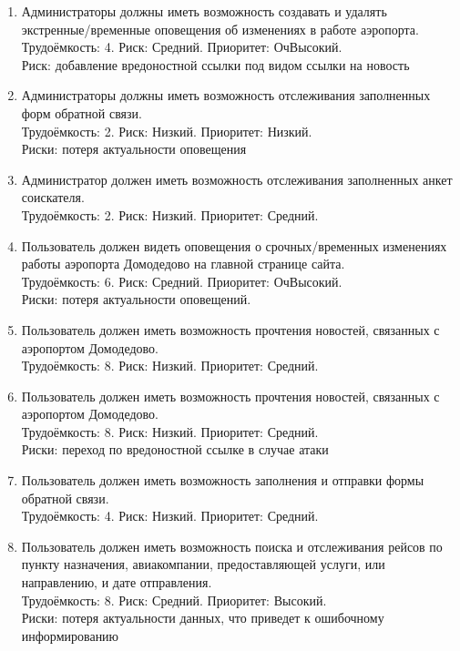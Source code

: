 \begin{enumerate}
    \item Администраторы должны иметь возможность создавать и удалять
          экстренные/временные оповещения об изменениях в работе аэропорта. \\
          Трудоёмкость: 4. Риск: Средний. Приоритет: ОчВысокий. \\
          Риск: добавление вредоностной ссылки под видом ссылки на новость

    \item Администраторы должны иметь возможность отслеживания
          заполненных форм обратной связи. \\
          Трудоёмкость: 2. Риск: Низкий. Приоритет: Низкий. \\
          Риски: потеря актуальности оповещения

    \item Администратор должен иметь возможность отслеживания
          заполненных анкет соискателя. \\
          Трудоёмкость: 2. Риск: Низкий. Приоритет: Средний.

    \item Пользователь должен видеть оповещения о срочных/временных
          изменениях работы аэропорта Домодедово на главной странице сайта. \\
          Трудоёмкость: 6. Риск: Средний. Приоритет: ОчВысокий. \\
          Риски: потеря актуальности оповещений.
          
    \item Пользователь должен иметь возможность прочтения новостей,
          связанных с аэропортом Домодедово. \\
          Трудоёмкость: 8. Риск: Низкий. Приоритет: Средний.

    \item Пользователь должен иметь возможность прочтения новостей,
          связанных с аэропортом Домодедово. \\
          Трудоёмкость: 8. Риск: Низкий. Приоритет: Средний. \\
          Риски: переход по вредоностной ссылке в случае атаки

    \item Пользователь должен иметь возможность заполнения и 
          отправки формы обратной связи. \\
          Трудоёмкость: 4. Риск: Низкий. Приоритет: Средний.

    \item Пользователь должен иметь возможность поиска и отслеживания 
          рейсов по пункту назначения, авиакомпании, предоставляющей услуги, 
          или направлению, и дате отправления. \\
          Трудоёмкость: 8. Риск: Средний. Приоритет: Высокий. \\
          Риски: потеря актуальности данных, что приведет к 
          ошибочному информированию


\end{enumerate}

